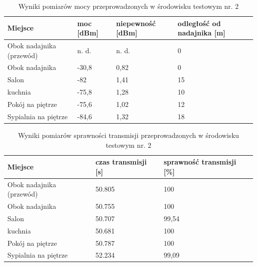 \documentclass[12pt, twoside, openany]{mwrep}
\begin{document}
\begin{table}[H]
\begin{tabular}{|l|l|l|l|}
\hline
Miejsce                    & moc {[}dBm{]} & niepewność   {[}dBm{]} & odległość   od nadajnika {[}m{]} \\ \hline
Obok   nadajnika (przewód) & n. d.         & n. d.                  & 0                                \\ \hline
Obok nadajnika             & -30,8         & 0,82                    & 0                                \\ \hline
Salon                      & -82           & 1,41            & 15                               \\ \hline
kuchnia                    & -75,8         & 1,28            & 10                               \\ \hline
Pokój na   piętrze         & -75,6         & 1,02            & 12                               \\ \hline
Sypialnia na   piętrze     & -84,6         & 1,32            & 18                               \\ \hline
\end{tabular}
\caption{Wyniki pomiarów mocy przeprowadzonych w środowisku testowym nr. 2}
\end{table}

\begin{table}[H]
\begin{tabular}{|l|l|l|}
\hline
Miejsce                    & czas transmisji {[}s{]} & sprawność transmisji {[}\%{]} \\ \hline
Obok   nadajnika (przewód) & 50.805                  & 100                           \\ \hline
Obok nadajnika             & 50.755                  & 100                           \\ \hline
Salon                      & 50.707                  & 99,54                         \\ \hline
kuchnia                    & 50.681                  & 100                           \\ \hline
Pokój na   piętrze         & 50.787                  & 100                           \\ \hline
Sypialnia na   piętrze     & 52.234                  & 99,09                         \\ \hline
\end{tabular}
\caption{Wyniki pomiarów sprawności transmisji przeprowadzonych w środowisku testowym nr. 2}
\end{table}
\end{document}
